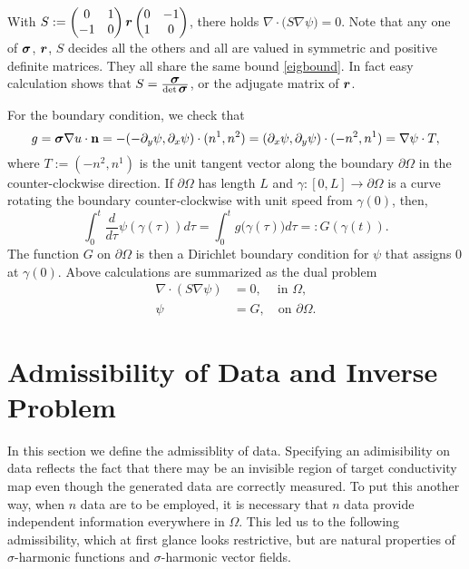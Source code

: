 \documentclass[11pt]{amsart}
\theoremstyle{plain}
\theoremstyle{remark}
\numberwithin{equation}{section}
\numberwithin{Thm}{section}
\def\r{{\bf r}}
\def\n{{\bf n}}
\def\Sigma{\mbox{\boldmath$\sigma$}}
\def\r{\mbox{\boldmath$r$}}
\begin{document}
With $S := \begin{pmatrix} 0 & 1 \\ -1 & 0 \end{pmatrix} \r \begin{pmatrix} 0 & -1 \\ 1 & 0 \end{pmatrix}$, there holds $\nabla \cdot \big(S \nabla \psi) = 0$. Note that any one of $\Sigma$, $\r$, $S$ decides all the others and all are valued in symmetric and positive definite matrices. They all share the same bound \eqref{eigbound}. In fact easy calculation shows that $S= \frac{\Sigma}{\det \Sigma}$, or the adjugate matrix of $\r$. 

For the boundary condition, we check that 
$$
g = \Sigma\nabla u \cdot \n= -(-\partial_y \psi, \partial_x \psi) \cdot (n^1,n^2) =(\partial_x \psi,\partial_y \psi) \cdot (-n^2,n^1) = \nabla \psi\cdot T,
$$
where $T:=(-n^2,n^1)$ is the unit tangent vector along the boundary $\partial\Omega$ in the counter-clockwise direction. If $\partial\Omega$ has length $L$ and $\gamma: [0, L] \to \partial\Omega$ is a curve rotating the boundary counter-clockwise with unit speed from $\gamma(0)$, then, 
$$
\int_0^t \frac{d}{d\tau} \psi(\gamma(\tau)) d\tau = \int_0^t g\big(\gamma(\tau)\big) d\tau
=:G(\gamma(t)).
$$
The function $G$ on $\partial\Omega$ is then a Dirichlet boundary condition for $\psi$ that assigns $0$ at $\gamma(0)$. Above calculations are summarized as the dual problem 
\begin{align}
 \nabla\cdot(S\nabla \psi)  &=0,\ \quad \text{in $\Omega$}, \label{eqn:div2}\\
 \psi&=G, \quad \text{on $\partial\Omega$}.                \label{eqn:div2Nbdry}
\end{align}

\section{Admissibility of Data and Inverse Problem} \label{sec:adm}

In this section we define the admissiblity of data. Specifying an adimisibility on data reflects the fact that there may be an invisible region of target conductivity map even though the generated data are correctly measured. To put this another way, when $n$ data are to be employed, it is necessary that $n$ data provide independent information everywhere in $\Omega$. This led us to the following admissibility, which at first glance looks restrictive, but are natural properties of $\sigma$-harmonic functions and $\sigma$-harmonic vector fields. 
\end{document}
